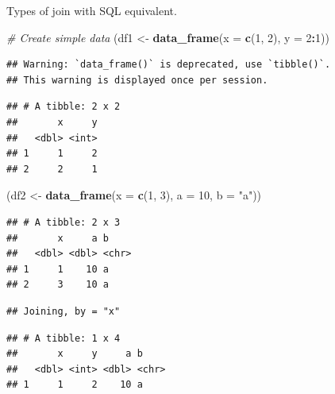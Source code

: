 \documentclass[]{book}
\newenvironment{Shaded}{\begin{snugshade}}{\end{snugshade}}
\newcommand{\CommentTok}[1]{\textcolor[rgb]{0.56,0.35,0.01}{\textit{#1}}}
\newcommand{\DataTypeTok}[1]{\textcolor[rgb]{0.13,0.29,0.53}{#1}}
\newcommand{\DecValTok}[1]{\textcolor[rgb]{0.00,0.00,0.81}{#1}}
\newcommand{\KeywordTok}[1]{\textcolor[rgb]{0.13,0.29,0.53}{\textbf{#1}}}
\newcommand{\NormalTok}[1]{#1}
\newcommand{\OperatorTok}[1]{\textcolor[rgb]{0.81,0.36,0.00}{\textbf{#1}}}
\newcommand{\StringTok}[1]{\textcolor[rgb]{0.31,0.60,0.02}{#1}}
\theoremstyle{definition}
\theoremstyle{definition}
\theoremstyle{definition}
\theoremstyle{remark}
\begin{document}
Types of join with SQL equivalent.

\begin{Shaded}
\begin{Highlighting}[]
\CommentTok{# Create simple data}
\NormalTok{(df1 <-}\StringTok{ }\KeywordTok{data_frame}\NormalTok{(}\DataTypeTok{x =} \KeywordTok{c}\NormalTok{(}\DecValTok{1}\NormalTok{, }\DecValTok{2}\NormalTok{), }\DataTypeTok{y =} \DecValTok{2}\OperatorTok{:}\DecValTok{1}\NormalTok{))}
\end{Highlighting}
\end{Shaded}

\begin{verbatim}
## Warning: `data_frame()` is deprecated, use `tibble()`.
## This warning is displayed once per session.
\end{verbatim}

\begin{verbatim}
## # A tibble: 2 x 2
##       x     y
##   <dbl> <int>
## 1     1     2
## 2     2     1
\end{verbatim}

\begin{Shaded}
\begin{Highlighting}[]
\NormalTok{(df2 <-}\StringTok{ }\KeywordTok{data_frame}\NormalTok{(}\DataTypeTok{x =} \KeywordTok{c}\NormalTok{(}\DecValTok{1}\NormalTok{, }\DecValTok{3}\NormalTok{), }\DataTypeTok{a =} \DecValTok{10}\NormalTok{, }\DataTypeTok{b =} \StringTok{"a"}\NormalTok{))}
\end{Highlighting}
\end{Shaded}

\begin{verbatim}
## # A tibble: 2 x 3
##       x     a b    
##   <dbl> <dbl> <chr>
## 1     1    10 a    
## 2     3    10 a
\end{verbatim}

\begin{Shaded}
\end{Shaded}

\begin{verbatim}
## Joining, by = "x"
\end{verbatim}

\begin{verbatim}
## # A tibble: 1 x 4
##       x     y     a b    
##   <dbl> <int> <dbl> <chr>
## 1     1     2    10 a
\end{verbatim}
\end{document}
